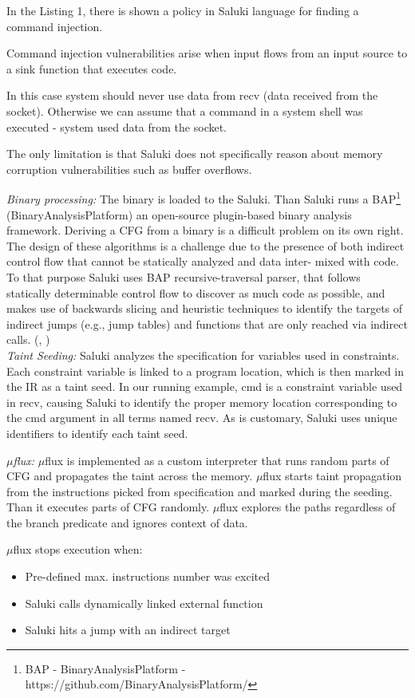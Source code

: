 \documentclass[a4paper, 12pt, journal, onecolumn]{IEEEtran}
\begin{document}
In the Listing 1, there is shown a policy in Saluki language for finding a command injection. 

Command injection vulnerabilities arise when input flows from an input source to a sink function that executes code. 

In this case system should never use data from recv (data received from the socket). Otherwise we can assume that a command in a system shell was executed - system used data from the socket. 

The only limitation is that Saluki does not specifically reason about memory corruption vulnerabilities such as buffer overflows.
\bigskip

\textit{Binary processing:} The binary is loaded to the Saluki. Than Saluki runs a BAP\footnote{BAP - BinaryAnalysisPlatform - https://github.com/BinaryAnalysisPlatform/} (BinaryAnalysisPlatform) an open-source plugin-based binary analysis framework. Deriving a CFG from a binary is a difficult problem on its own right. The design of these algorithms is a challenge due to the presence of both indirect control flow that cannot be statically analyzed and data inter- mixed with code.\cite{CFG} To that purpose Saluki uses BAP recursive-traversal parser, that follows statically determinable control flow to discover as much code as possible, and makes use of backwards slicing and heuristic techniques to identify the targets of indirect jumps (e.g., jump tables) and functions that are only reached via indirect calls. (\cite{a8}, \cite{BAP})
\\

\textit{Taint Seeding:} Saluki analyzes the specification for variables used in constraints. Each constraint variable is linked to
a program location, which is then marked in the IR as a taint
seed. In our running example, cmd is a constraint variable used
in recv, causing Saluki to identify the proper memory location
corresponding to the cmd argument in all terms named recv.
As is customary, Saluki uses unique identifiers to identify each
taint seed.\cite{saluki}
\bigskip

\textit{$\mu$flux:} $\mu$flux is implemented as a custom interpreter that runs random parts of CFG and propagates the taint across the memory. $\mu$flux starts taint propagation from the instructions picked from specification and marked during the seeding. Than it executes parts of CFG randomly. $\mu$flux explores the paths regardless of the branch predicate and ignores context of data.
\medskip

$\mu$flux stops execution when:
\begin{itemize}
\item Pre-defined max. instructions number was excited
\item Saluki calls dynamically linked external function
\item Saluki hits a jump with an indirect target
\end{itemize}
\end{document}
